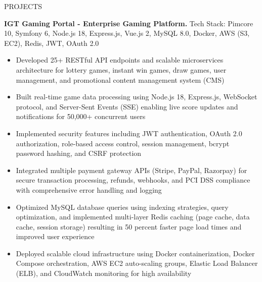 \documentclass{resume} %
\begin{document}

\begin{rSection}{PROJECTS}
\vspace{-1.25em}

\item \textbf{IGT Gaming Portal - Enterprise Gaming Platform.} {Tech Stack: Pimcore 10, Symfony 6, Node.js 18, Express.js, Vue.js 2, MySQL 8.0, Docker, AWS (S3, EC2), Redis, JWT, OAuth 2.0}
\begin{itemize}
    \itemsep -3pt {}
    \item Developed 25+ RESTful API endpoints and scalable microservices architecture for lottery games, instant win games, draw games, user management, and promotional content management system (CMS)
    \item Built real-time game data processing using Node.js 18, Express.js, WebSocket protocol, and Server-Sent Events (SSE) enabling live score updates and notifications for 50,000+ concurrent users
    \item Implemented security features including JWT authentication, OAuth 2.0 authorization, role-based access control, session management, bcrypt password hashing, and CSRF protection
    \item Integrated multiple payment gateway APIs (Stripe, PayPal, Razorpay) for secure transaction processing, refunds, webhooks, and PCI DSS compliance with comprehensive error handling and logging
    \item Optimized MySQL database queries using indexing strategies, query optimization, and implemented multi-layer Redis caching (page cache, data cache, session storage) resulting in 50 percent faster page load times and improved user experience
    \item Deployed scalable cloud infrastructure using Docker containerization, Docker Compose orchestration, AWS EC2 auto-scaling groups, Elastic Load Balancer (ELB), and CloudWatch monitoring for high availability
\end{itemize}


\end{rSection}
\end{document}
